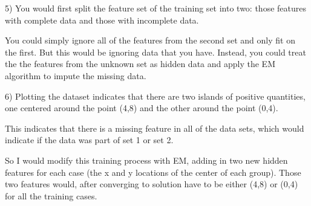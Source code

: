 \documentclass[12pt]{article}
\begin{document}
\pagebreak
\setcounter{equation}{0}
5) You would first split the feature set of the training set
into two: those features with complete data and those with incomplete data. 

You could simply ignore all of the features from the second set and only fit on the first. But 
this would be ignoring data that you have. Instead, you could treat the the features from 
the unknown set as hidden data and apply the EM algorithm to impute the missing data. 

6) Plotting the dataset indicates that there are two islands of positive quantities, 
one centered around the point (4,8) and the other around the point (0,4). 

This indicates that there is a missing feature in all of the data sets, which 
would indicate if the data was part of set 1 or set 2. 

So I would modify this training process with EM, adding in two new hidden features 
for each case (the x and y locations of the center of each group). Those two 
features would, after converging to solution have to be either (4,8) or (0,4) 
for all the training cases. 
\end{document}
